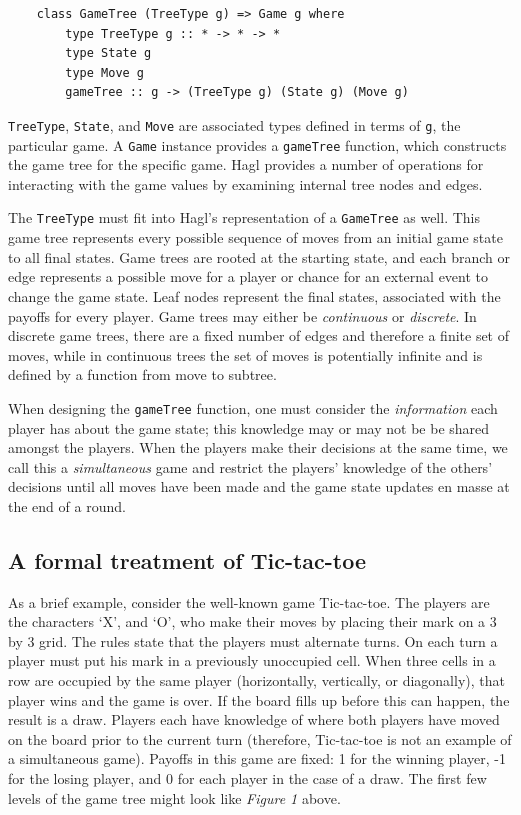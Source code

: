 \documentclass{article}
\begin{document}
\begin{verbatim}
    class GameTree (TreeType g) => Game g where
        type TreeType g :: * -> * -> *
        type State g
        type Move g
        gameTree :: g -> (TreeType g) (State g) (Move g)
\end{verbatim}

\texttt{TreeType}, \texttt{State}, and \texttt{Move} are associated
types defined in terms of \texttt{g}, the particular game. A \texttt{Game}
instance provides a \texttt{gameTree} function, which constructs the
game tree for the specific game. Hagl provides a number of operations
for interacting with the game values by examining internal tree nodes
and edges.

The \texttt{TreeType} must fit into Hagl's representation of a
\texttt{GameTree} as well. This game tree represents every possible
sequence of moves from an initial game state to all final states. Game
trees are rooted at the starting state, and each branch or edge
represents a possible move for a player or chance for an external event
to change the game state. Leaf nodes represent the final states,
associated with the payoffs for every player. Game trees may either be
\emph{continuous} or \emph{discrete}.  In discrete game trees, there
are a fixed number of edges and therefore a finite set of moves, while
in continuous trees the set of moves is potentially infinite and is
defined by a function from move to subtree.

When designing the \texttt{gameTree} function, one must consider the
\emph{information} each player has about the game state; this knowledge
may or may not be be shared amongst the players. When the players make
their decisions at the same time, we call this a \emph{simultaneous}
game and restrict the players' knowledge of the others' decisions until
all moves have been made and the game state updates en masse at the end
of a round.

\subsection{A formal treatment of
Tic-tac-toe}

As a brief example, consider the well-known game Tic-tac-toe.  The players
are the characters `X', and `O', who make their moves by placing their
mark on a 3 by 3 grid. The rules state that the players must alternate
turns. On each turn a player must put his mark in a previously
unoccupied cell. When three cells in a row are occupied by the same
player (horizontally, vertically, or diagonally), that player wins and
the game is over. If the board fills up before this can happen, the
result is a draw. Players each have knowledge of where both players have
moved on the board prior to the current turn (therefore, Tic-tac-toe is
not an example of a simultaneous game). Payoffs in this game are fixed:
1 for the winning player, -1 for the losing player, and 0 for each
player in the case of a draw. The first few levels of the game tree
might look like \emph{Figure 1} above.
\end{document}
